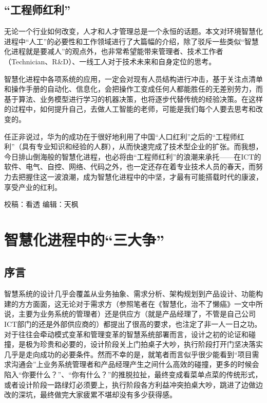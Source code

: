 \documentclass[
]{book}
\begin{document}
\hypertarget{ux5de5ux7a0bux5e08ux7ea2ux5229}{%
\subsection{``工程师红利''}\label{ux5de5ux7a0bux5e08ux7ea2ux5229}}

无论一个行业如何改变，人才和人才管理总是一个永恒的话题。本文对环境智慧化进程中``人工''的必要性和工作领域进行了大篇幅的介绍，除了驳斥一些类似``智慧化进程就是要减人''的观点外，也非常希望能带来管理者、技术工作者（Technician、R\&D）、一线工人对于技术未来和自身定位的思考。

智慧化进程中各项系统的应用，一定会对现有人员结构进行冲击，基于关注点清单和操作手册的自动化、信息化，会把操作工变成任何人都能胜任的无差别劳力，而基于算法、业务模型进行学习的机器决策，也将逐步代替传统的经验决策。在这样的过程中，如何提升自己，去做人工智能的老师，可能是我们每个人要去思考和改变的。

任正非说过，华为的成功在于很好地利用了中国``人口红利''之后的``工程师红利''（具有专业知识和经验的人群），从而快速完成了技术型企业的扩张。而我想，今日排山倒海般的智慧化进程，也必将由``工程师红利''的浪潮来承托------在ICT的软件、电气、自控、网络、代码之外，也一定还存在着专业技术人员的春天，而努力去把握住这一波浪潮，成为智慧化进程中的中坚，才最有可能搭载时代的康波，享受产业的红利。

校稿：看透
编辑：天枫

\hypertarget{ux667aux6167ux5316ux8fdbux7a0bux4e2dux7684ux4e09ux5927ux4e89}{%
\section{智慧化进程中的``三大争''}\label{ux667aux6167ux5316ux8fdbux7a0bux4e2dux7684ux4e09ux5927ux4e89}}

\hypertarget{ux5e8fux8a00-1}{%
\subsection{序言}\label{ux5e8fux8a00-1}}

智慧系统的设计几乎会覆盖从业务抽象、需求分析、架构规划到产品设计、功能构建的方方面面，这无论对于需求方（参照笔者在《智慧化，治不了懒癌》一文中所说，主要为业务系统的管理者）还是供应方（就是产品经理了，不管是自己公司ICT部门的还是外部供应商的）都提出了很高的要求，也注定了非一人一日之功。对于往往会牵动模式变革和管理变革的智慧系统部署而言，设计之初的论证和碰撞，是极为珍贵和必要的，设计阶段关上门拍桌子大吵，执行阶段打开门坚决落实几乎是走向成功的必要条件。然而不幸的是，就笔者而言似乎很少能看到``项目需求沟通会''上业务系统管理者和产品经理产生之间什么高效的碰撞，更多的时候会陷入``你要什么？''、``你有什么？''的推脱拉扯，最终变成看菜单点菜的传统形式，或者设计阶段一路绿灯必须要上，执行阶段各方利益冲突拍桌大吵，跳进了边做边改的深坑，最终做完大家疲累不堪却没有多少获得感。
\end{document}

